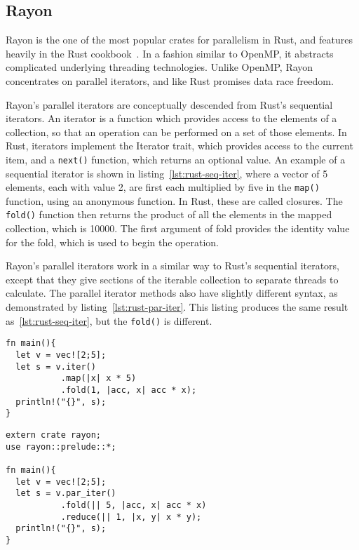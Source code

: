 \subsection{Rayon}\label{sec:back-rayon}
Rayon is the one of the most popular crates for parallelism in Rust, and features heavily in the Rust cookbook~\cite{RustCookPara}. In a fashion similar to OpenMP, it abstracts complicated underlying threading technologies. Unlike OpenMP, Rayon concentrates on parallel iterators, and like Rust promises data race freedom.

Rayon's parallel iterators are conceptually descended from Rust's sequential iterators. An iterator is a function which provides access to the elements of a collection, so that an operation can be performed on a set of those elements. In Rust, iterators implement the Iterator trait, which provides access to the current item, and a \texttt{next()} function, which returns an optional value. An example of a sequential iterator is shown in listing~\ref{lst:rust-seq-iter}, where a vector of 5 elements, each with value 2, are first each multiplied by five in the \texttt{map()} function, using an anonymous function. In Rust, these are called closures. The \texttt{fold()} function then returns the product of all the elements in the mapped collection, which is 10000. The first argument of fold provides the identity value for the fold, which is used to begin the operation.

Rayon's parallel iterators work in a similar way to Rust's sequential iterators, except that they give sections of the iterable collection to separate threads to calculate. The parallel iterator methods also have slightly different syntax, as demonstrated by listing~\ref{lst:rust-par-iter}. This listing produces the same result as~\ref{lst:rust-seq-iter}, but the \texttt{fold()} is different.

\noindent\begin{minipage}{.49\textwidth}
\begin{code}
\begin{verbatim}
fn main(){
  let v = vec![2;5];
  let s = v.iter()
           .map(|x| x * 5)
           .fold(1, |acc, x| acc * x);
  println!("{}", s);
}
\end{verbatim}
\label{lst:rust-seq-iter}
\end{code}
\end{minipage}\hfill
\begin{minipage}{.49\textwidth}
\begin{code}
\begin{verbatim}
extern crate rayon;
use rayon::prelude::*;

fn main(){
  let v = vec![2;5];
  let s = v.par_iter()
           .fold(|| 5, |acc, x| acc * x)
           .reduce(|| 1, |x, y| x * y);
  println!("{}", s);
}
\end{verbatim}
\label{lst:rust-par-iter}
\label{lst:iters-a}
\end{code}
\end{minipage}

